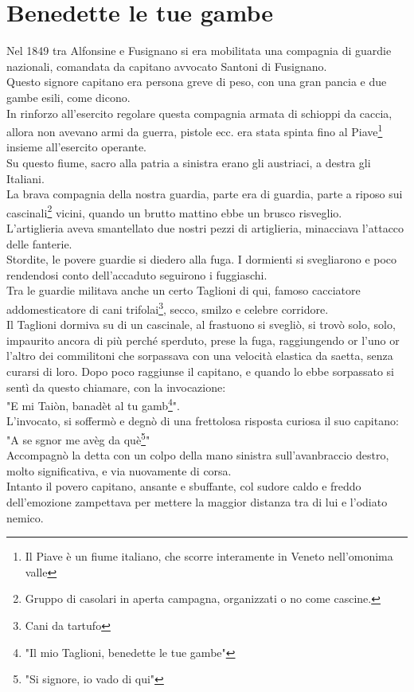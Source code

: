 
\chapter{Benedette le tue gambe}
Nel 1849 tra Alfonsine e Fusignano si era mobilitata una compagnia di guardie nazionali, comandata da capitano avvocato  Santoni di Fusignano.\\
Questo signore capitano era persona greve di peso, con una gran pancia e due gambe esili, come dicono.\\
In rinforzo all'esercito regolare questa compagnia armata di schioppi da caccia, allora non avevano armi da guerra, pistole ecc. era stata spinta fino al Piave\footnote{Il Piave è un fiume italiano, che scorre interamente in Veneto nell'omonima valle} insieme all'esercito operante.\\
Su questo fiume, sacro alla patria a sinistra erano gli austriaci, a destra gli Italiani.\\
La brava compagnia della nostra guardia, parte era di guardia, parte a riposo sui cascinali\footnote{Gruppo di casolari in aperta campagna, organizzati o no come cascine.} vicini, quando un brutto mattino ebbe un brusco risveglio.\\
L'artiglieria aveva smantellato due nostri pezzi di artiglieria, minacciava l'attacco delle fanterie. \\
Stordite, le povere guardie si diedero alla fuga. I dormienti si svegliarono e poco rendendosi conto dell'accaduto seguirono i fuggiaschi.\\
Tra le guardie militava anche un certo Taglioni di qui, famoso cacciatore addomesticatore di cani trifolai\footnote{Cani da tartufo}, secco, smilzo e celebre corridore. \\
Il Taglioni dormiva su di un cascinale, al frastuono si svegliò, si trovò solo, solo, impaurito ancora di più perché sperduto, prese la fuga, raggiungendo or l'uno or l'altro dei commilitoni che sorpassava con una velocità elastica da saetta, senza curarsi di loro. 
Dopo poco raggiunse il capitano, e quando lo ebbe sorpassato si sentì da questo chiamare, con la invocazione:\\
"E mi Taiòn, banadèt al tu gamb\footnote{"Il mio Taglioni, benedette le tue gambe"}".\\
L'invocato, si soffermò e degnò di una frettolosa risposta curiosa il suo capitano:\\
"A se sgnor me avèg da què\footnote{"Si signore, io vado di qui"}"\\
Accompagnò la detta con un colpo della mano sinistra sull'avanbraccio destro, molto significativa, e via nuovamente di corsa.\\
Intanto il povero capitano, ansante e sbuffante, col sudore caldo e freddo dell'emozione zampettava per mettere la maggior distanza tra di lui e l'odiato nemico.\\